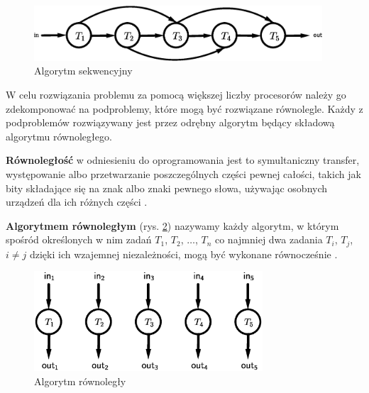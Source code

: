 \begin{figure}[h]
\centering
\includegraphics[width=29em]{images/Rys2.eps}
\caption{Algorytm sekwencyjny}
\label{fig:sequential}
\end{figure}

W celu rozwiązania problemu za pomocą większej liczby procesorów należy go zdekomponować na podproblemy, które mogą być rozwiązane równolegle. Każdy z podproblemów rozwiązywany jest przez odrębny algorytm będący składową algorytmu równoległego.


\begin{definicja}[Równoległość]\label{def:rownoleglosc}
\textbf{Równoległość} w odniesieniu do oprogramowania jest to symultaniczny transfer, występowanie albo przetwarzanie poszczególnych części pewnej całości, takich jak bity składające się na znak albo znaki pewnego słowa, używając osobnych urządzeń dla ich różnych części \cite{IEEE}.
\end{definicja}


\begin{definicja}\label{def:algorytm_rownolegly}
\textbf{Algorytmem równoległym} (rys. \ref{fig:parallel}) nazywamy każdy algorytm, w którym spośród określonych w nim zadań \(T_1\), \(T_2\), \(\dots\), \(T_n\) co najmniej dwa zadania \(T_i\), \(T_j\), \(i\neq j\) dzięki ich wzajemnej niezależności, mogą być wykonane równocześnie \cite{APC2011}.\\
\end{definicja}

\begin{figure}[h]
\centering
\includegraphics[width=23em]{images/Rys1.eps}
\caption{Algorytm równoległy}
\label{fig:parallel}
\end{figure}



%
%
%
%
